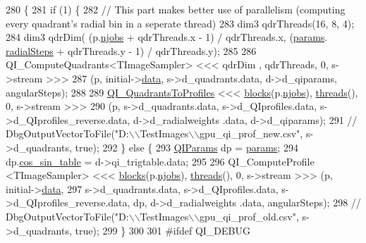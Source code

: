 \begin{DoxyCode}
280 \{
281     \textcolor{keywordflow}{if} (1) \{
282         \textcolor{comment}{// This part makes better use of parallelism (computing every quadrant's radial bin in a seperate
       thread)           }
283         dim3 qdrThreads(16, 8, 4);
284         dim3 qdrDim( (p.\hyperlink{struct_base_kernel_params_aec40d44810d0e0a6640c66038af1fbf2}{njobs} + qdrThreads.x - 1) / qdrThreads.x, (\hyperlink{class_q_i_af69f420666212bcf5f10a5cf03cd161a}{params}.
      \hyperlink{struct_q_i_params_a19b7d550113364de4e4f11e2c9cfea0e}{radialSteps} + qdrThreads.y - 1) / qdrThreads.y);
285 
286         QI\_ComputeQuadrants<TImageSampler> <<< qdrDim , qdrThreads, 0, s->stream >>> 
287             (p, initial->\hyperlink{classdevice__vec_a908e53910a02968513832c242790caa0}{data}, s->d\_quadrants.data, d->d\_qiparams, angularSteps);
288         
289         \hyperlink{group__kernels_ga0a68cdd1dd0c10476711ae6d4316fb40}{QI\_QuadrantsToProfiles} <<< \hyperlink{class_q_i_aae8ddb96f755ee2cc38d9fb36e742dde}{blocks}(p.\hyperlink{struct_base_kernel_params_aec40d44810d0e0a6640c66038af1fbf2}{njobs}), 
      \hyperlink{class_q_i_aef6a690a8934bcc7ced5332518b04660}{threads}(), 0, s->stream >>> 
290             (p, s->d\_quadrants.data, s->d\_QIprofiles.data, s->d\_QIprofiles\_reverse.data, d->d\_radialweights
      .data, d->d\_qiparams);
291         \textcolor{comment}{// DbgOutputVectorToFile("D:\(\backslash\)\(\backslash\)TestImages\(\backslash\)\(\backslash\)gpu\_qi\_prof\_new.csv", s->d\_quadrants, true);}
292     \} \textcolor{keywordflow}{else} \{
293         \hyperlink{struct_q_i_params}{QIParams} dp = \hyperlink{class_q_i_af69f420666212bcf5f10a5cf03cd161a}{params};
294         dp.\hyperlink{struct_q_i_params_a8da3ccdd4b94c119a0d63ff63f28b8e7}{cos\_sin\_table} = d->qi\_trigtable.data;
295 
296         QI\_ComputeProfile <TImageSampler> <<< \hyperlink{class_q_i_aae8ddb96f755ee2cc38d9fb36e742dde}{blocks}(p.\hyperlink{struct_base_kernel_params_aec40d44810d0e0a6640c66038af1fbf2}{njobs}), 
      \hyperlink{class_q_i_aef6a690a8934bcc7ced5332518b04660}{threads}(), 0, s->stream >>> (p, initial->\hyperlink{classdevice__vec_a908e53910a02968513832c242790caa0}{data}, 
297             s->d\_quadrants.data, s->d\_QIprofiles.data, s->d\_QIprofiles\_reverse.data, dp, d->d\_radialweights
      .data, angularSteps);
298         \textcolor{comment}{// DbgOutputVectorToFile("D:\(\backslash\)\(\backslash\)TestImages\(\backslash\)\(\backslash\)gpu\_qi\_prof\_old.csv", s->d\_quadrants, true);}
299     \}
300 
301 \textcolor{preprocessor}{#ifdef QI\_DEBUG}

\end{DoxyCode}
